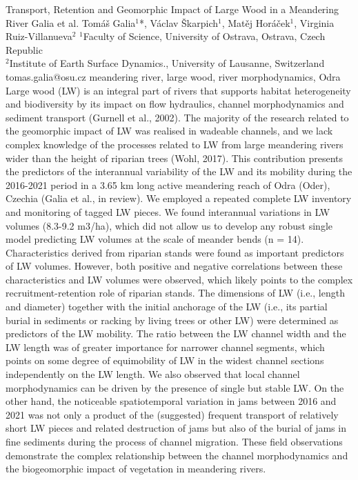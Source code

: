 \abstract
{Transport, Retention and Geomorphic Impact of Large Wood in a Meandering River
} %
{Galia et al.} %
{Tomáš Galia$^1$*, Václav Škarpich$^1$, Matěj Horáček$^1$, Virginia Ruiz-Villanueva$^2$} %
{\KLtag} %
{$^1$Faculty of Science, University of Ostrava, Ostrava, Czech Republic\\
	$^2$Institute of Earth Surface Dynamics., University of Lausanne, Switzerland
} %
{tomas.galia@osu.cz}  %
{meandering river, large wood, river morphodynamics, Odra}%
{Large wood (LW) is an integral part of rivers that supports habitat heterogeneity and biodiversity by its impact on flow hydraulics, channel morphodynamics and sediment transport (Gurnell et al., 2002). The majority of the research related to the geomorphic impact of LW was realised in wadeable channels, and we lack complex knowledge of the processes related to LW from large meandering rivers wider than the height of riparian trees (Wohl, 2017). This contribution presents the predictors of the interannual variability of the LW and its mobility during the 2016-2021 period in a 3.65 km long active meandering reach of Odra (Oder), Czechia (Galia et al., in review). We employed a repeated complete LW inventory and monitoring of tagged LW pieces. We found interannual variations in LW volumes (8.3-9.2 m3/ha), which did not allow us to develop any robust single model predicting LW volumes at the scale of meander bends (n = 14). Characteristics derived from riparian stands were found as important predictors of LW volumes. However, both positive and negative correlations between these characteristics and LW volumes were observed, which likely points to the complex recruitment-retention role of riparian stands. The dimensions of LW (i.e., length and diameter) together with the initial anchorage of the LW (i.e., its partial burial in sediments or racking by living trees or other LW) were determined as predictors of the LW mobility. The ratio between the LW channel width and the LW length was of greater importance for narrower channel segments, which points on some degree of equimobility of LW in the widest channel sections independently on the LW length. We also observed that local channel morphodynamics can be driven by the presence of single but stable LW. On the other hand, the noticeable spatiotemporal variation in jams between 2016 and 2021 was not only a product of the (suggested) frequent transport of relatively short LW pieces and related destruction of jams but also of the burial of jams in fine sediments during the process of channel migration. These field observations demonstrate the complex relationship between the channel morphodynamics and the biogeomorphic impact of vegetation in meandering rivers.
}%

